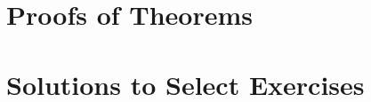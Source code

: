 \documentclass{book}
\begin{document}
\appendix
\begin{appendices}
\chapter{Proofs of Theorems}\label{chap:proof}
    
    
    
    
    
    

\chapter{Solutions to Select Exercises}\label{apx:solutions}

%
%


\end{appendices}
\end{document}
